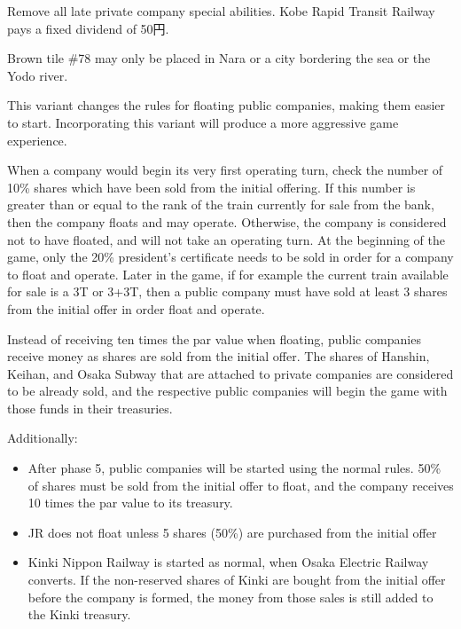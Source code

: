 \begin{multicols}{2}
Remove all late private company special abilities. Kobe Rapid Transit
Railway pays a fixed dividend of 50円.

Brown tile \#78 may only be placed in Nara or a city bordering the sea
or the Yodo river.

This variant changes the rules for floating public companies, making
them easier to start. Incorporating this variant will produce a more
aggressive game experience.

When a company would begin its very first operating turn, check the
number of 10\% shares which have been sold from the initial
offering. If this number is greater than or equal to the rank of the
train currently for sale from the bank, then the company floats and
may operate. Otherwise, the company is considered not to have floated,
and will not take an operating turn. At the beginning of the game,
only the 20\% president's certificate needs to be sold in order for a
company to float and operate. Later in the game, if for example the
current train available for sale is a 3T or 3+3T, then a public
company must have sold at least 3 shares from the initial offer in
order float and operate.

Instead of receiving ten times the par value when floating, public
companies receive money as shares are sold from the initial offer. The
shares of Hanshin, Keihan, and Osaka Subway that are attached to
private companies are considered to be already sold, and the
respective public companies will begin the game with those funds in
their treasuries.

Additionally:
\begin{itemize}

\item After phase 5, public companies will be started using the normal
  rules. 50\% of shares must be sold from the initial offer to float,
  and the company receives 10 times the par value to its treasury.

\item JR does not float unless 5 shares (50\%) are purchased
  from the initial offer

\item Kinki Nippon Railway is started as normal, when Osaka Electric
  Railway converts. If the non-reserved shares of Kinki are bought
  from the initial offer before the company is formed, the money from
  those sales is still added to the Kinki treasury.


\end{itemize}
\end{multicols}
